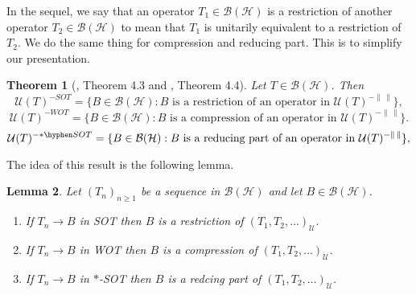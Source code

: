 \documentclass[11pt]{amsart}
\newtheorem{theorem}{Theorem}[section]
\newtheorem{lemma}[theorem]{Lemma}
\theoremstyle{definition}
\numberwithin{equation}{section}
\begin{document}
In the sequel, we say that an operator $T_{1}\in \mathcal{B(H)}$ is a restriction of another operator $T_{2}\in \mathcal{B(H)}$ to mean that $T_{1}$ is unitarily
equivalent to a restriction of $T_{2}$. We do the same thing for compression and reducing part. This is to simplify our presentation.
\begin{theorem}[\cite{Hadwin1}, Theorem 4.3 and \cite{Hadwin2}, Theorem 4.4]\label{37}
Let $T\in \mathcal{B(H)}$. Then
\begin{equation}\label{31e}
\mathcal{U}(T)^{-SOT}=\{B\in \mathcal{B(H)}:B\text{ is a restriction of an operator in }\mathcal{U}(T)^{-\|\,\|}\},
\end{equation}
\begin{equation*}
\mathcal{U}(T)^{-WOT}=\{B\in \mathcal{B(H)}:B\text{ is a compression of an operator in }\mathcal{U}(T)^{-\|\,\|}\}.
\end{equation*}
\begin{equation*}
\mathcal{U}(T)^{-*\hyphen SOT}=\{B\in \mathcal{B(H)}:B\text{ is a reducing part of an operator in }\mathcal{U}(T)^{-\|\,\|}\},
\end{equation*}
\end{theorem}
The idea of this result is the following lemma.
\begin{lemma}\label{38}
Let $(T_{n})_{n\geq 1}$ be a sequence in $\mathcal{B(H)}$ and let $B\in\mathcal{B(H)}$.
\begin{enumerate}[(1)]
\item If $T_{n}\to B$ in SOT then $B$ is a restriction of $(T_{1},T_{2},\ldots)_{\mathscr{U}}$.
\item If $T_{n}\to B$ in WOT then $B$ is a compression of $(T_{1},T_{2},\ldots)_{\mathscr{U}}$.
\item If $T_{n}\to B$ in $*$-SOT then $B$ is a redcing part of $(T_{1},T_{2},\ldots)_{\mathscr{U}}$.
\end{enumerate}
\end{lemma}
\end{document}

